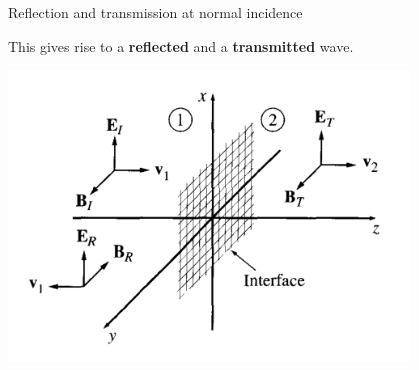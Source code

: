 %
%
%

\begin{frame}{Reflection and transmission at normal incidence}

This gives rise to a {\bf reflected} and a {\bf transmitted} wave.\\
\begin{center}
    \includegraphics[width=0.80\textwidth]{./images/schematics/wave_reflection_transmission_normal_incidence_2.png}\\
\end{center}

\end{frame}


%
%
%

